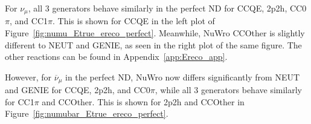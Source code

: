 \documentclass[12pt]{article}
\begin{document}

For $\nu_\mu$, all 3 generators behave similarly in the perfect ND for CCQE, 2p2h, CC0$\pi$, and CC1$\pi$. This is shown for CCQE in the left plot of Figure~\ref{fig:numu_Etrue_ereco_perfect}. Meanwhile, NuWro CCOther is slightly different to NEUT and GENIE, as seen in the right plot of the same figure. The other reactions can be found in Appendix~\ref{app:Ereco_app}. 

However, for $\overline{\nu}_\mu$ in the perfect ND, NuWro now differs significantly from NEUT and GENIE for CCQE, 2p2h, and CC0$\pi$, while all 3 generators behave similarly for CC1$\pi$ and CCOther. This is shown for 2p2h and CCOther in Figure~\ref{fig:numubar_Etrue_ereco_perfect}.
\end{document}
